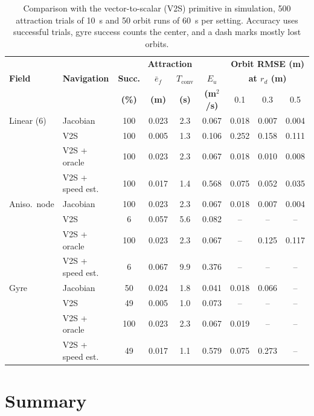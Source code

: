 \begin{table}[htbp]
\centering
\scriptsize
\caption{Comparison with the vector-to-scalar (V2S) primitive in simulation, 500 attraction trials of 10~s and 50 orbit runs of 60~s per setting. Accuracy uses successful trials, gyre success counts the center, and a dash marks mostly lost orbits.}
\label{tab:ch6:baselines}
\setlength{\tabcolsep}{1.8pt}
\begin{tabular}{ll|cccc|ccc}
\hline
 & & \multicolumn{4}{c|}{\textbf{Attraction}} & \multicolumn{3}{c}{\textbf{Orbit RMSE (m)}} \\
\textbf{Field} & \textbf{Navigation} & \textbf{Succ.} & \textbf{$\bar{e}_f$} & \textbf{$T_{\mathrm{conv}}$} & \textbf{$E_u$} & \multicolumn{3}{c}{\textbf{at $r_d$ (m)}} \\
 & & \textbf{(\%)} & \textbf{(m)} & \textbf{(s)} & \textbf{(m$^2$/s)} & 0.1 & 0.3 & 0.5 \\
\hline
Linear (6) & Jacobian & 100 & 0.023 & 2.3 & 0.067 & 0.018 & 0.007 & 0.004 \\
 & V2S & 100 & 0.005 & 1.3 & 0.106 & 0.252 & 0.158 & 0.111 \\
 & V2S + oracle & 100 & 0.023 & 2.3 & 0.067 & 0.018 & 0.010 & 0.008 \\
 & V2S + speed est. & 100 & 0.017 & 1.4 & 0.568 & 0.075 & 0.052 & 0.035 \\
\hline
Aniso.\ node & Jacobian & 100 & 0.023 & 2.3 & 0.067 & 0.018 & 0.007 & 0.004 \\
 & V2S & 6 & 0.057 & 5.6 & 0.082 & -- & -- & -- \\
 & V2S + oracle & 100 & 0.023 & 2.3 & 0.067 & -- & 0.125 & 0.117 \\
 & V2S + speed est. & 6 & 0.067 & 9.9 & 0.376 & -- & -- & -- \\
\hline
Gyre & Jacobian & 50 & 0.024 & 1.8 & 0.041 & 0.018 & 0.066 & -- \\
 & V2S & 49 & 0.005 & 1.0 & 0.073 & -- & -- & -- \\
 & V2S + oracle & 100 & 0.023 & 2.3 & 0.067 & 0.019 & -- & -- \\
 & V2S + speed est. & 49 & 0.017 & 1.1 & 0.579 & 0.075 & 0.273 & -- \\
\hline
\end{tabular}
\end{table}

\section{Summary}
\label{sec:ch6:summary}

